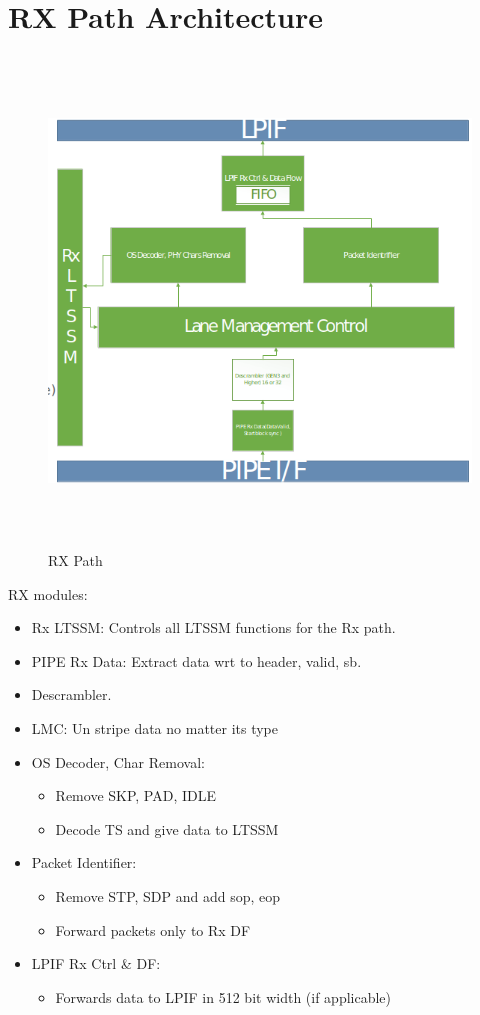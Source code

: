 \section{RX Path Architecture}
  \begin{figure}[H]
    \centering
    \includegraphics[width=130mm,height=130mm]{images/RX.png}
    \caption{RX Path}
      \label{fig:arch}
    \end{figure}
    RX modules:
      \begin{itemize}
        \item Rx LTSSM: Controls all LTSSM functions for the Rx path.
        \item PIPE Rx Data: Extract data wrt to header, valid, sb.
        \item Descrambler.
        \item LMC:
        Un stripe data no matter its type
        \item OS Decoder, Char Removal:
        \begin{itemize}
          \item Remove SKP, PAD, IDLE
          \item Decode TS and give data to LTSSM
        \end{itemize}  
        \item Packet Identifier:
        \begin{itemize}
          \item Remove STP, SDP and add sop, eop
          \item Forward packets only to Rx DF
        \end{itemize}
        \item LPIF Rx Ctrl \& DF:
        \begin{itemize}
        \item Forwards data to LPIF in 512 bit width (if applicable)
        \end{itemize}
      \end{itemize}